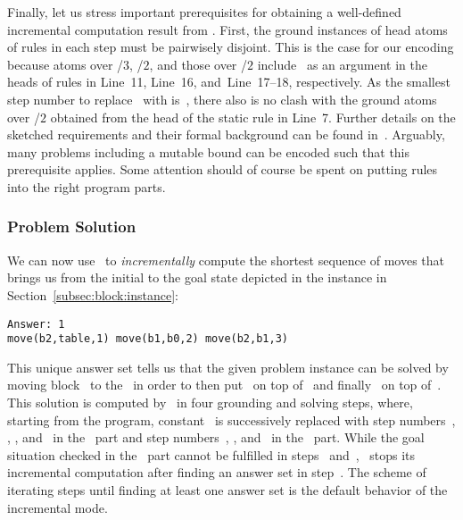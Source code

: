 Finally, let us stress important prerequisites for obtaining
a well-defined incremental computation result from \clingo.
First, the ground instances of head atoms of rules in each step must be pairwisely disjoint.
This is the case for our encoding because atoms over /$3$, /$2$,
and those over /$2$ include~ as an argument in the
heads of rules in Line~11, Line~16, and~Line~17--18, respectively.
As the smallest step number to replace~ with is~,
there also is no clash with the ground atoms over /$2$
obtained from the head of the static rule in Line~7.
Further details on the sketched requirements and their formal background can
be found in~\cite{gekakaosscth08a}.
Arguably, many problems including a mutable bound can be encoded
such that this prerequisite applies.
Some attention should of course be spent on putting rules into the right program parts.

\subsubsection{Problem Solution}\label{subsec:block:solution}

We can now use \clingo\ to \emph{incrementally} compute the shortest
sequence of moves that brings us from the initial to the goal state
depicted in the instance in Section~\ref{subsec:block:instance}:%
%
\begin{lstlisting}[numbers=none]
Answer: 1
move(b2,table,1) move(b1,b0,2) move(b2,b1,3)
\end{lstlisting}
%
This unique answer set tells us that the given problem instance can
be solved by moving block~ to the~ in order to
then put~ on top of~ and finally~ on top of~.
This solution is computed by \clingo\ in four grounding and solving steps,
where, starting from the  program, constant~
is successively replaced with step numbers~, , , and~
in the~ part and step numbers~, , and~ in the~ part.
While the goal situation checked in the~ part cannot be
fulfilled in steps~ and~, \clingo\ 
stops its incremental computation after finding an answer set in step~.
The scheme of iterating steps until finding at least one answer set
is the default behavior of the incremental mode.

